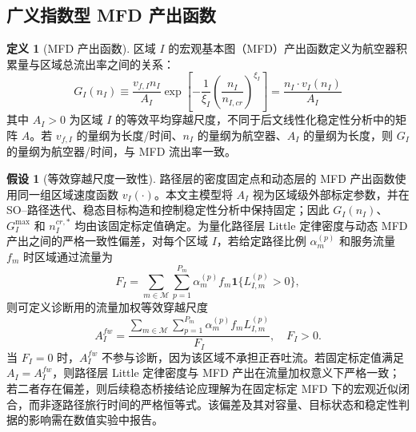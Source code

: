 \documentclass[a4paper,12pt]{article}
\theoremstyle{plain}
\theoremstyle{definition}
\newtheorem{definition}[theorem]{定义}
\newtheorem{assumption}[theorem]{假设}
\theoremstyle{remark}
\begin{document}
\subsection{广义指数型 MFD 产出函数}\label{subsec:mfd_derivation}

\begin{definition}[MFD 产出函数]\label{def:mfd}
区域 $I$ 的宏观基本图（MFD）产出函数定义为航空器积累量与区域总流出率之间的关系：
\begin{equation}\label{eq:mfd_from_speed}
    G_I(n_I)
    \equiv
    \frac{v_{f,I}n_I}{A_I}
    \exp\left[
        -\frac{1}{\xi_I}
        \left(\frac{n_I}{n_{I,cr}}\right)^{\xi_I}
    \right]
    =
    \frac{n_I \cdot v_I(n_I)}{A_I}
\end{equation}
其中 $A_I>0$ 为区域 $I$ 的等效平均穿越尺度，不同于后文线性化稳定性分析中的矩阵 $A$。若 $v_{f,I}$ 的量纲为长度/时间、$n_I$ 的量纲为航空器、$A_I$ 的量纲为长度，则 $G_I$ 的量纲为航空器/时间，与 MFD 流出率一致。
\end{definition}

\begin{assumption}[等效穿越尺度一致性]\label{asm:representative_length}
路径层的密度固定点和动态层的 MFD 产出函数使用同一组区域速度函数 $v_I(\cdot)$。本文主模型将 $A_I$ 视为区域级外部标定参数，并在 SO--路径迭代、稳态目标构造和控制稳定性分析中保持固定；因此 $G_I(n_I)$、$G_I^{\max}$ 和 $n_I^{cr,*}$ 均由该固定标定值确定。为量化路径层 Little 定律密度与动态 MFD 产出之间的严格一致性偏差，对每个区域 $I$，若给定路径比例 $\alpha_m^{(p)}$ 和服务流量 $f_m$ 时区域通过流量为
\begin{equation}
    F_I=\sum_{m\in\mathcal M}\sum_{p=1}^{P_m}
    \alpha_m^{(p)}f_m\mathbf 1\{L_{I,m}^{(p)}>0\},
\end{equation}
则可定义诊断用的流量加权等效穿越尺度
\begin{equation}\label{eq:representative_length}
    A_I^{fw} =
    \frac{\sum_{m\in\mathcal M}\sum_{p=1}^{P_m}\alpha_m^{(p)}f_m L_{I,m}^{(p)}}{F_I},
    \quad F_I>0 .
\end{equation}
当 $F_I=0$ 时，$A_I^{fw}$ 不参与诊断，因为该区域不承担正吞吐流。若固定标定值满足 $A_I=A_I^{fw}$，则路径层 Little 定律密度与 MFD 产出在流量加权意义下严格一致；若二者存在偏差，则后续稳态桥接结论应理解为在固定标定 MFD 下的宏观近似闭合，而非逐路径旅行时间的严格恒等式。该偏差及其对容量、目标状态和稳定性判据的影响需在数值实验中报告。
\end{assumption}
\end{document}
